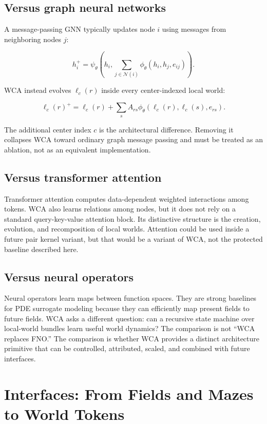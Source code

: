 \documentclass[11pt]{article}
\begin{document}
\subsection{Versus graph neural networks}

A message-passing GNN typically updates node $i$ using messages from neighboring
nodes $j$:

\[
h_{i}^{+}
=
\psi_\theta
\left(
h_i,
\sum_{j\in \mathcal{N}(i)}
\phi_\theta(h_i,h_j,e_{ij})
\right).
\]

WCA instead evolves $\ell_c(r)$ inside every center-indexed local world:

\[
\ell_c(r)^{+}
=
\ell_c(r)
+
\sum_s A_{rs}\phi_\theta(\ell_c(r),\ell_c(s),e_{rs}).
\]

The additional center index $c$ is the architectural difference. Removing it
collapses WCA toward ordinary graph message passing and must be treated as an
ablation, not as an equivalent implementation.

\subsection{Versus transformer attention}

Transformer attention computes data-dependent weighted interactions among
tokens. WCA also learns relations among nodes, but it does not rely on a
standard query-key-value attention block. Its distinctive structure is the
creation, evolution, and recomposition of local worlds. Attention could be used
inside a future pair kernel variant, but that would be a variant of WCA, not the
protected baseline described here.

\subsection{Versus neural operators}

Neural operators learn maps between function spaces. They are strong baselines
for PDE surrogate modeling because they can efficiently map present fields to
future fields. WCA asks a different question: can a recursive state machine
over local-world bundles learn useful world dynamics? The comparison is not
``WCA replaces FNO.'' The comparison is whether WCA provides a distinct
architecture primitive that can be controlled, attributed, scaled, and combined
with future interfaces.

\section{Interfaces: From Fields and Mazes to World Tokens}
\end{document}
